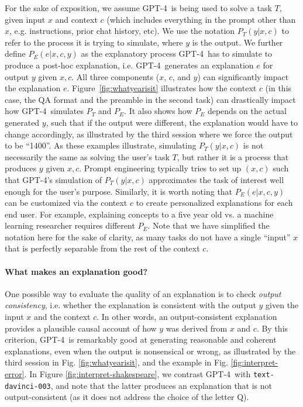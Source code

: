 For the sake of exposition, we assume GPT-4\ is being used to solve a task $T$, given input $x$ and context $c$ (which includes everything in the prompt other than $x$, e.g. instructions, prior chat history, etc). We use the notation $P_T(y | x, c)$ to refer to the process it is trying to simulate, where $y$ is the output. We further define $P_E(e | x, c, y)$ as the explanatory process GPT-4\ has to simulate to produce a post-hoc explanation,  i.e. GPT-4\ generates an explanation $e$ for output $y$ given $x, c$. All three components ($x$, $c$, and $y$) can significantly impact the explanation $e$. Figure~\ref{fig:whatyearisit} illustrates how the context $c$ (in this case, the QA format and the preamble in the second task) can drastically impact how GPT-4\ simulates $P_T$ and $P_E$. It also shows how $P_E$ depends on the actual generated $y$, such that if the output were different, the explanation would have to change accordingly, as illustrated by the third session where we force the output to be ``1400''. As these examples illustrate, simulating $P_T(y | x, c)$ is not necessarily the same as solving the user's task $T$, but rather it is a process that produces $y$ given $x, c$. Prompt engineering typically tries to set up $(x, c)$ such that {GPT-4}'s simulation of $P_T(y | x, c)$ approximates the task of interest well enough for the user's purpose. Similarly, it is worth noting that $P_E(e | x, c, y)$ can be customized via the context $c$ to create personalized explanations for each end user. For example, explaining concepts to a five year old vs. a machine learning researcher requires different $P_E$. Note that we have simplified the notation here for the sake of clarity, as many tasks do not have a single ``input'' $x$ that is perfectly separable from the rest of the context $c$.

\paragraph{What makes an explanation good?} One possible way to evaluate the quality of an explanation is to check \emph{output consistency}, i.e. whether the explanation is consistent with the output $y$ given the input $x$ and the context $c$. In other words, an output-consistent explanation provides a plausible causal account of how $y$ was derived from $x$ and $c$. By this criterion, GPT-4\ is remarkably good at generating reasonable and coherent explanations, even when the output is nonsensical or wrong, as illustrated by the third session in Fig. \ref{fig:whatyearisit}, and the example in Fig. \ref{fig:interpret-error}. In Figure \ref{fig:interpret-shakespeare}, we contrast GPT-4\ with \texttt{text-davinci-003}, and note that the latter produces an explanation that is not output-consistent (as it does not address the choice of the letter Q).

